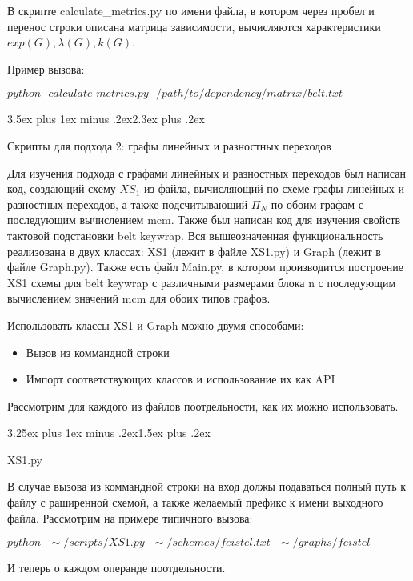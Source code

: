 \documentclass[a4paper,12pt]{report}
\makeatletter
\theoremstyle{plain} %
\theoremstyle{definition}
\theoremstyle{remark}
\renewcommand{\section}{\@startsection{section}{1}{18pt}%
{3.5ex plus 1ex minus .2ex}{2.3ex plus .2ex}%
{\normalfont\Large\bfseries\raggedright}}%
\renewcommand{\subsection}{\@startsection{subsection}{2}{18pt}%
{3.25ex plus 1ex minus .2ex}{1.5ex plus .2ex}%
{\normalfont\large\bfseries\raggedright}}%
\makeatother
\begin{document}
\begin{large}
В скрипте calculate\_metrics.py по имени файла, в котором через пробел и перенос строки описана матрица зависимости, вычисляются характеристики $exp(G), \lambda(G), k(G)$.

Пример вызова:

$python~~~calculate\_metrics.py~~~/path/to/dependency/matrix/belt.txt$

\section{Скрипты для подхода 2: графы линейных и разностных переходов}

Для изучения подхода с графами линейных и разностных переходов был написан код, создающий схему $XS_1$ из файла, вычисляющий по схеме графы линейных и разностных переходов, а также подсчитывающий $\Pi_N$ по обоим графам с последующим вычислением mcm. Также был написан код для изучения свойств тактовой подстановки belt keywrap. Вся вышеозначенная функциональность реализована в двух классах: XS1 (лежит в файле XS1.py) и Graph (лежит в файле Graph.py). Также есть файл Main.py, в котором производится построение XS1 схемы для belt keywrap с различными размерами блока n с последующим вычислением значений mcm для обоих типов графов. 

 Использовать классы XS1 и Graph можно двумя способами:

\begin{itemize}
\item Вызов из коммандной строки
\item Импорт соответствующих классов и использование их как API
\end{itemize}

Рассмотрим для каждого из файлов поотдельности, как их можно использовать.

\subsection{XS1.py}

В случае вызова из коммандной строки на вход должы подаваться полный путь к файлу с раширенной схемой, а также желаемый префикс к имени выходного файла. Рассмотрим на примере типичного вызова:

$python ~~~\sim/scripts/XS1.py~~~ \sim/schemes/feistel.txt~~~ \sim/graphs/feistel$

И теперь о каждом операнде поотдельности.


\end{large}
\end{document}
